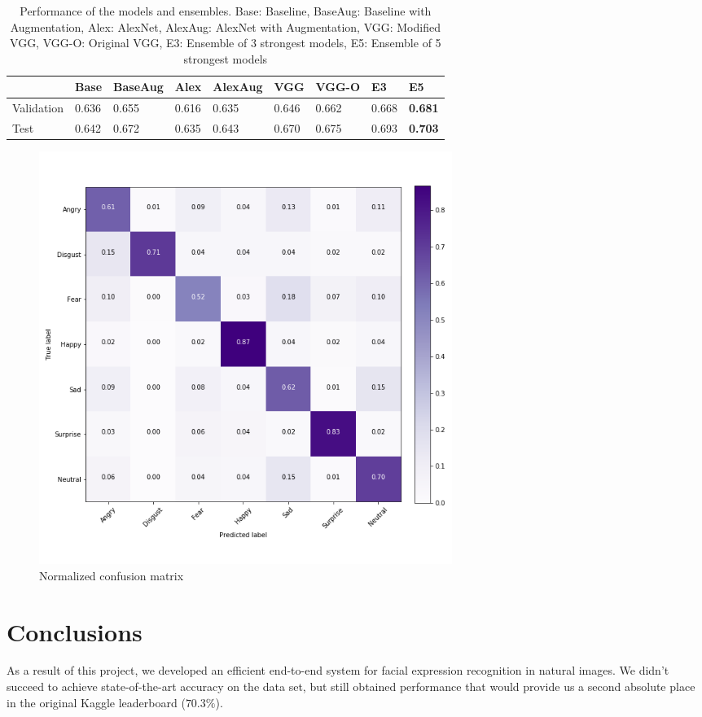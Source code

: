 \begin{table}[H]
	\centering
	\begin{tabular}{ | l | l | l | l | l | l | l | l | l | }
		\hline
		 & Base & BaseAug & Alex & AlexAug & VGG & VGG-O & E3 & E5 \\ 
		\hline
		Validation & 0.636 & 0.655 & 0.616 & 0.635 & 0.646 & 0.662 & 0.668 & \textbf{0.681} \\
		Test & 0.642 & 0.672 & 0.635 & 0.643 & 0.670 & 0.675 & 0.693 & \textbf{0.703} \\ 
		\hline
	\end{tabular}
	\caption{Performance of the models and ensembles. Base: Baseline, BaseAug: Baseline with Augmentation, Alex: AlexNet, AlexAug: AlexNet with Augmentation, VGG: Modified VGG, VGG-O: Original VGG, E3: Ensemble of 3 strongest models, E5: Ensemble of 5 strongest models}
	\label{table:acc}
\end{table}

\begin{figure}
	\centering
	\includegraphics[width=0.65\textwidth]{../images/confusion.png}
	\caption{Normalized confusion matrix}
	\label{fig:conf}
\end{figure}

\section{Conclusions}

As a result of this project, we developed an efficient end-to-end system for facial expression recognition in natural images. We didn't succeed to achieve state-of-the-art accuracy on the data set, but still obtained performance that would provide us a second absolute place in the original Kaggle leaderboard ($70.3\%$).\\

